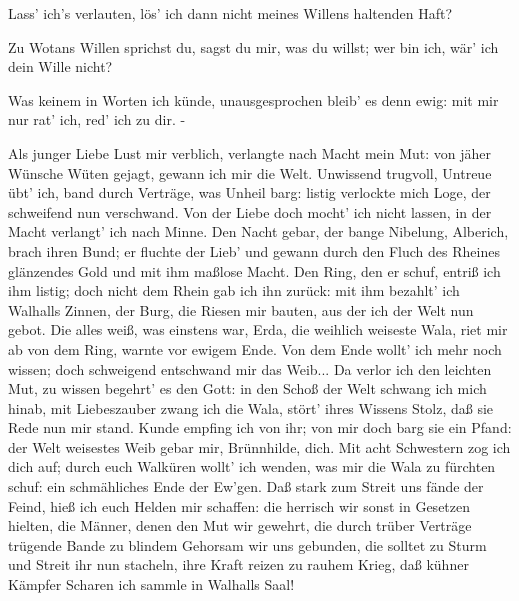 \begin{drama}
Lass' ich's verlauten,
lös' ich dann nicht meines Willens haltenden Haft?
 

\Brunnhildespeaks


Zu Wotans Willen sprichst du,
sagst du mir, was du willst;
wer bin ich, wär' ich dein Wille nicht?
 

\Wotanspeaks


Was keinem in Worten ich künde,
unausgesprochen bleib' es denn ewig:
mit mir nur rat' ich, red' ich zu dir. -
 



Als junger Liebe Lust mir verblich,
verlangte nach Macht mein Mut:
von jäher Wünsche Wüten gejagt,
gewann ich mir die Welt.
Unwissend trugvoll, Untreue übt' ich,
band durch Verträge, was Unheil barg:
listig verlockte mich Loge,
der schweifend nun verschwand.
Von der Liebe doch mocht' ich nicht lassen,
in der Macht verlangt' ich nach Minne.
Den Nacht gebar, der bange Nibelung,
Alberich, brach ihren Bund;
er fluchte der Lieb' und gewann durch den Fluch
des Rheines glänzendes Gold
und mit ihm maßlose Macht.
Den Ring, den er schuf,
entriß ich ihm listig;
doch nicht dem Rhein gab ich ihn zurück:
mit ihm bezahlt' ich Walhalls Zinnen,
der Burg, die Riesen mir bauten,
aus der ich der Welt nun gebot.
Die alles weiß, was einstens war,
Erda, die weihlich weiseste Wala,
riet mir ab von dem Ring,
warnte vor ewigem Ende.
Von dem Ende wollt' ich mehr noch wissen;
doch schweigend entschwand mir das Weib...
Da verlor ich den leichten Mut,
zu wissen begehrt' es den Gott:
in den Schoß der Welt schwang ich mich hinab,
mit Liebeszauber zwang ich die Wala,
stört' ihres Wissens Stolz, daß sie Rede nun mir stand.
Kunde empfing ich von ihr;
von mir doch barg sie ein Pfand:
der Welt weisestes Weib
gebar mir, Brünnhilde, dich.
Mit acht Schwestern zog ich dich auf;
durch euch Walküren wollt' ich wenden,
was mir die Wala zu fürchten schuf:
ein schmähliches Ende der Ew'gen.
Daß stark zum Streit uns fände der Feind,
hieß ich euch Helden mir schaffen:
die herrisch wir sonst
in Gesetzen hielten,
die Männer, denen den Mut wir gewehrt,
die durch trüber Verträge trügende Bande
zu blindem Gehorsam wir uns gebunden,
die solltet zu Sturm
und Streit ihr nun stacheln,
ihre Kraft reizen zu rauhem Krieg,
daß kühner Kämpfer Scharen
ich sammle in Walhalls Saal!
 


\end{drama}
